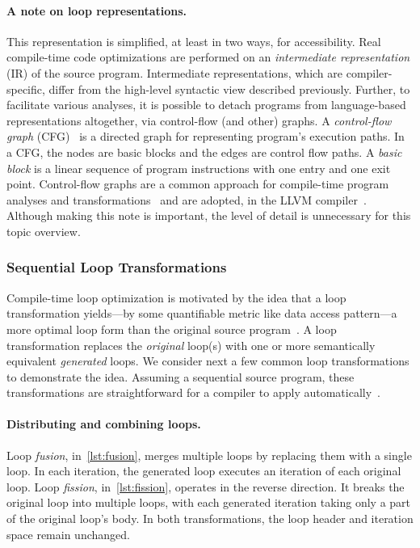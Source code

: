 \paragraph*{A note on loop representations.}
This representation is simplified, at least in two ways, for accessibility.
Real compile-time code optimizations are performed
on an \emph{intermediate representation} (IR) of the source program.
Intermediate representations, which are compiler-specific, differ from the high-level syntactic view described previously.
Further, to facilitate various analyses, it is possible to {detach} programs from language-based representations altogether,
via control-flow (and other) graphs.
A \emph{control-flow graph} (CFG)~\cite{allen1970} is a directed graph for representing program's execution paths.
In a CFG, the nodes are {basic blocks} and the edges are control flow paths.
A \emph{basic block} is a linear sequence of program instructions with one entry and one exit point.
Control-flow graphs
are a common approach for compile-time program analyses and transformations~\cite[p. 48]{moyen2017}
and are adopted, \eg in the LLVM compiler~\cite{llvm_loops}.
Although making this note is important, the level of detail is unnecessary for this topic overview.

\subsubsection{Sequential Loop Transformations}
\label{loop-transforms}

Compile-time loop optimization is motivated by the idea that a loop {transformation} yields---by some quantifiable metric like data access pattern---a more optimal loop form than the original source program~\cite{alfred2007}.
A loop transformation replaces the \emph{original} loop(s) with one or more semantically equivalent \emph{generated} loops.
We consider next a few common loop transformations to demonstrate the idea.
Assuming a sequential source program, these transformations are straightforward for a compiler to apply automatically~\cite{bertolacci2018}.

\paragraph*{Distributing and combining loops.}
Loop \emph{fusion}, in~\autoref{lst:fusion}, merges multiple loops by replacing them with a single loop.
In each iteration, the generated loop executes an iteration of each original loop.
Loop \emph{fission}, in~\autoref{lst:fission}, operates in the reverse direction.
It breaks the original loop into multiple loops, with each generated iteration taking only a part of the original loop's body.
In both transformations, the loop header and iteration space remain unchanged.

